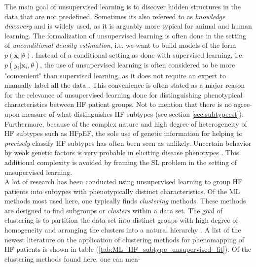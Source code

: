 \documentclass[../thesis.tex]{subfiles}
\begin{document}
\noindent The main goal of unsupervised learning is to discover hidden structures in the data that are not predefined. Sometimes its also refereed to as \textit{knowledge discovery} and is widely used, as it is arguably more typical for animal and human learning. The formalization of unsupervised learning is often done in the setting of \textit{unconditional density estimation}, i.e. we want to build models of the form $p(\mathbf{x}_i | \theta)$. Instead of a conditional setting as done with supervised learning, i.e. $p(y_i | \mathbf{x}_i, \theta)$, the use of unsupervised learning is often considered to be more "convenient" than supervised learning, as it does not require an expert to manually label all the data \citep{muphy2012machine}. This convenience is often stated as a major reason for the relevance of unsupervised learning done for distinguishing phenotypical characteristics between HF patient groups. Not to mention that there is no agree-upon measure of what distinguishes HF subtypes (see section \ref{sec:subtypeest}). Furthermore, because of the complex nature and high degree of heterogeneity of HF subtypes such as HFpEF, the sole use of genetic information for helping to \textit{precisely} classify HF subtypes has often been seen as unlikely. Uncertain behavior by weak genetic factors is very probable in eliciting disease phenotypes \citep{deo2015machine}. This additional complexity is avoided by framing the SL problem in the setting of unsupervised learning.\\
\indent A lot of research has been conducted using unsupervised learning to group HF patients into subtypes with phenotypically distinct characteristics. Of the ML methods most used here, one typically finds \textit{clustering} methods. These methods are designed to find subgroups or \textit{clusters} within a data set. The goal of clustering is to partition the data set into distinct groups with high degree of homogeneity and arranging the clusters into a natural hierarchy \citep{friedman2009elements}. A list of the newest literature on the application of clustering methods for phenomapping of HF patients is shown in table (\ref{tab:ML_HF_subtype_unsupervised_lit}). Of the clustering methods found here, one can men-


\end{document}
